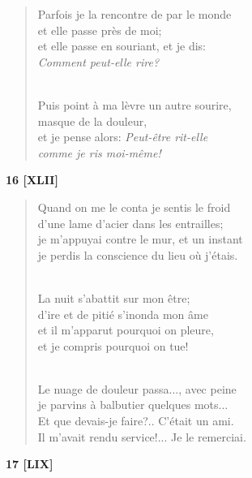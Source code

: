 \documentclass[a4paper,12pt]{book}
\begin{document}
\begin{verse}
Parfois je la rencontre de par le monde \\
et elle passe près de moi; \\
et elle passe en souriant, et je dis: \\
{\em Comment peut-elle {\em rire\/}?} \\ \

Puis point à ma lèvre un autre sourire, \\
masque de la douleur, \\
et je pense alors: {\em Peut-être rit-elle \\
comme je ris moi-même!} \\
\end{verse}

\bigskip

\begin{center} {\bf 16 [XLII]} \end{center}

\begin{verse}
Quand on me le conta je sentis le froid \\
d'une lame d'acier dans les entrailles; \\
je m'appuyai contre le mur, et un instant \\
je perdis la conscience du lieu où j'étais. \\ \

La nuit s'abattit sur mon être; \\
d'ire et de pitié s'inonda mon âme \\
et il m'apparut pourquoi on pleure, \\
et je compris pourquoi on tue! \\ \

Le nuage de douleur passa..., avec peine \\
je parvins à balbutier quelques mots... \\
Et que devais-je faire?.. C'était un ami. \\
Il m'avait rendu service!... Je le remerciai. \\
\end{verse}

\bigskip

\begin{center} {\bf 17 [LIX]} \end{center}
\end{document}
